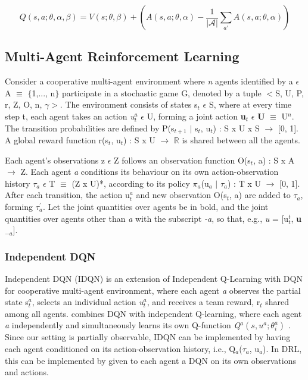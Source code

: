 \documentclass{llncs}
\begin{document}
\begin{equation} \label{eq:dueling eq}
Q(s,a;\theta,\alpha,\beta) = V(s;\theta,\beta) + \left( A\left(s,a;\theta,\alpha \right) - \frac{1}{|\mathcal{A}|} \displaystyle\sum_{a'} A\left(s,a;\theta,\alpha \right) \right) 
\end{equation}
	
\subsection{Multi-Agent Reinforcement Learning} \label{sec:MARL}

Consider a cooperative multi-agent environment where \textit{n} agents identified by a $\epsilon$ A $\equiv$ $\{$1,..., n$\}$ participate in a stochastic game G, denoted by a tuple $<$S, U, P, r, Z, O, n, $\gamma>$. The environment consists of states s$_{t}$ $\epsilon$ S, where at every time step t, each agent takes an action \textit{u$^{a}_{t}$} $\epsilon$ U, forming a joint action \textbf{u$_{t}$} $\epsilon$ \textbf{U} $\equiv$ U$^{n}$.
The transition probabilities are defined by P(s$_{t+1}$ $|$ s$_{t}$, u$_{t}$) : S x U x S $\rightarrow$ [0, 1]. A global reward function r(s$_{t}$, u$_{t}$) : S x U $\rightarrow$ $\mathbb{R}$ is shared between all the agents.

Each agent's observations z $\epsilon$ Z follows an observation function O(s$_{t}$, a) : S x A $\rightarrow$ Z. Each agent \textit{a} conditions its behaviour on its own action-observation history $\tau_{a}$ $\epsilon$ T $\equiv$ (Z x U)*, according to its policy $\pi_{a}$(u$_{a}$ $|$ $\tau_{a}$) : T x U $\rightarrow$ [0, 1]. After each transition, the action u$_{t}^{a}$ and new observation O(s$_{t}$, a) are added to $\tau_{a}$, forming $\tau_{a}^{'}$. Let the joint quantities over agents be in bold, and the joint quantities over agents other than \textit{a} with the subscript \textit{-a}, so that, e.g., \emph{u} = [u$_{t}^{t}$, \textbf{u}$_{-a}$].

\subsubsection{Independent DQN}

Independent DQN (IDQN) is an extension of Independent Q-Learning\cite{Tan1993} with DQN for cooperative multi-agent environment, where each agent \textit{a} observes the partial state s$_{t}^{a}$, selects an individual action \textit{u$_{t}^{a}$}, and receives a team reward, r$_{t}$ shared among all agents. \cite{Tampuu2015} combines DQN with independent Q-learning, where each agent \textit{a} independently and simultaneously learns its own Q-function \textit{Q$^{a}(s, u^{a};\theta^{a}_{i})$} \cite{DBLP:journals/corr/FoersterAFW16a}. Since our setting is partially observable, IDQN can be implemented by having each agent conditioned on its action-observation history, i.e., Q$_{a}$($\tau_{a}$, u$_{a}$). In DRL, this can be implemented by given to each agent a DQN on its own observations and actions.
\end{document}
